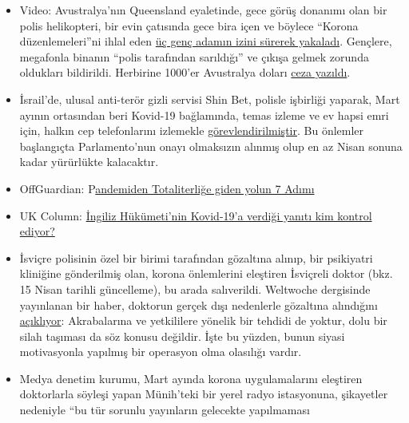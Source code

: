 \begin{itemize}
\tightlist
\item
  Video: Avustralya'nın Queensland eyaletinde, gece görüş donanımı olan
  bir polis helikopteri, bir evin çatısında gece bira içen ve böylece
  ``Korona düzenlemeleri''ni ihlal eden
  \href{https://twitter.com/Independent/status/1252911273597120513}{üç
  genç adamın izini sürerek yakaladı}. Gençlere, megafonla binanın
  ``polis tarafından sarıldığı'' ve çıkışa gelmek zorunda oldukları
  bildirildi. Herbirine 1000'er Avustralya doları
  \href{https://www.dailystar.co.uk/news/world-news/police-helicopter-uses-night-vision-21899640}{ceza
  yazıldı}.
\item
  İsrail'de, ulusal anti-terör gizli servisi Shin Bet, polisle işbirliği
  yaparak, Mart ayının ortasından beri Kovid-19 bağlamında, temas izleme
  ve ev hapsi emri için, halkın cep telefonlarını izlemekle
  \href{https://www.jewishpress.com/news/the-courts/state-to-high-court-even-more-shin-bet-involvement-in-fighting-the-coronavirus/2020/04/14/}{görevlendirilmiştir}.
  Bu önlemler başlangıçta Parlamento'nun onayı olmaksızın alınmış olup
  en az Nisan sonuna kadar yürürlükte kalacaktır.
\item
  OffGuardian:
  P\href{https://off-guardian.org/2020/04/23/the-seven-step-path-from-pandemic-to-totalitarianism/}{andemiden
  Totaliterliğ}\href{https://off-guardian.org/2020/04/23/the-seven-step-path-from-pandemic-to-totalitarianism/}{e
  giden yolun 7 Adımı}
\item
  UK Column:
  \href{https://www.ukcolumn.org/article/who-controls-british-government-response-covid19-part-one}{İngiliz
  Hükümeti'nin Kovid-19'a verdiği yanıtı kim kontrol ediyor?}
\item
  İsviçre polisinin özel bir birimi tarafından gözaltına alınıp, bir
  psikiyatri kliniğine gönderilmiş olan, korona önlemlerini eleştiren
  İsviçreli doktor (bkz. 15 Nisan tarihli güncelleme), bu arada
  salıverildi. Weltwoche dergisinde yayınlanan bir haber, doktorun
  gerçek dışı nedenlerle gözaltına alındığını
  \href{https://uncut-news.ch/wp-content/uploads/2020/04/Wer-l\%C3\%B6ste-den-Fehlalarm-aus.pdf}{açıklıyor}:
  Akrabalarına ve yetkililere yönelik bir tehdidi de yoktur, dolu bir
  silah taşıması da söz konusu değildir. İşte bu yüzden, bunun siyasi
  motivasyonla yapılmış bir operasyon olma olasılığı vardır.
\item
  Medya denetim kurumu, Mart ayında korona uygulamalarını eleştiren
  doktorlarla söyleşi yapan Münih'teki bir yerel radyo istasyonuna,
  şikayetler nedeniyle ``bu tür sorunlu yayınların gelecekte yapılmaması

\end{itemize}
